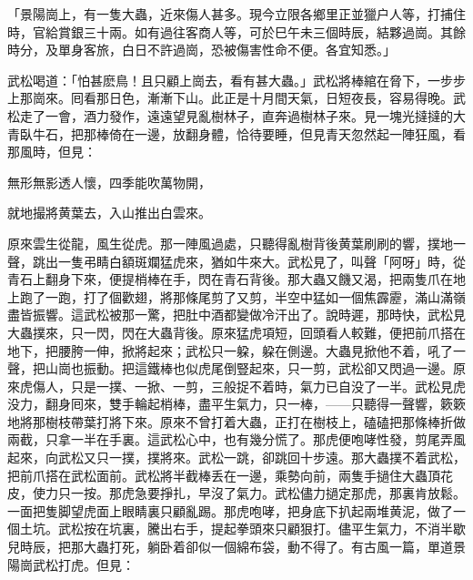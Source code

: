 \begin{myquote}[\markfont]
「景陽崗上，有一隻大蟲，近來傷人甚多。現今立限各鄉里正並獵户人等，打捕住時，官給賞銀三十兩。如有過往客商人等，可於巳午未三個時辰，結夥過崗。其餘時分，及單身客旅，白日不許過崗，恐被傷害性命不便。各宜知悉。」
\end{myquote}

武松喝道：「怕甚麽鳥！且只顧上崗去，看有甚大蟲。」武松將棒綰在脅下，一步步上那崗來。囘看那日色，漸漸下山。此正是十月間天氣，日短夜長，容易得晚。武松走了一會，酒力發作，遠遠望見亂樹林子，直奔過樹林子來。見一塊光撻撻的大青臥牛石，把那棒倚在一邊，放翻身體，恰待要睡，但見青天忽然起一陣狂風，看那風時，但見：

\begin{myquote}
無形無影透人懷，四季能吹萬物開，

就地撮將黄葉去，入山推出白雲來。
\end{myquote}

原來雲生從龍，風生從虎。那一陣風過處，只聽得亂樹背後黄葉刷刷的響，撲地一聲，跳出一隻弔睛白額斑斕猛虎來，猶如牛來大。武松見了，叫聲「阿呀」時，從青石上翻身下來，便提梢棒在手，閃在青石背後。那大蟲又饑又渴，把兩隻爪在地上跑了一跑，打了個歡翅，將那條尾剪了又剪，半空中猛如一個焦霹靂，滿山滿嶺盡皆振響。這武松被那一驚，把肚中酒都變做冷汗出了。說時遲，那時快，武松見大蟲撲來，只一閃，閃在大蟲背後。原來猛虎項短，回頭看人較難，便把前爪搭在地下，把腰胯一伸，掀將起來；武松只一躱，躱在側邊。大蟲見掀他不着，吼了一聲，把山崗也振動。把這鐵棒也似虎尾倒豎起來，只一剪，武松卻又閃過一邊。原來虎傷人，只是一撲、一掀、一剪，三般捉不着時，氣力已自没了一半。武松見虎没力，翻身囘來，雙手輪起梢棒，盡平生氣力，只一棒，——只聽得一聲響，簌簌地將那樹枝帶葉打將下來。原來不曾打着大蟲，正打在樹枝上，磕磕把那條棒折做兩截，只拿一半在手裏。這武松心中，也有幾分慌了。那虎便咆哮性發，剪尾弄風起來，向武松又只一撲，撲將來。武松一跳，卻跳回十步遠。那大蟲撲不着武松，把前爪搭在武松面前。武松將半截棒丢在一邊，乘勢向前，兩隻手撾住大蟲頂花皮，使力只一按。那虎急要掙扎，早沒了氣力。武松儘力撾定那虎，那裏肯放鬆。一面把隻脚望虎面上眼睛裏只顧亂踢。那虎咆哮，把身底下扒起兩堆黄泥，做了一個土坑。武松按在坑裏，騰出右手，提起拳頭來只顧狠打。儘平生氣力，不消半歇兒時辰，把那大蟲打死，躺卧着卻似一個綿布袋，動不得了。有古風一篇，單道景陽崗武松打虎。但見：

